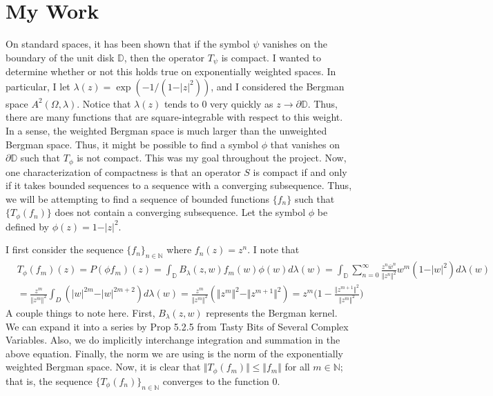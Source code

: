\documentclass[12pt]{article}
\newcommand{\N}{\mathbb{N}}
\begin{document}
\section*{My Work}
On standard spaces, it has been shown that if the symbol $\psi$ vanishes on the boundary of the unit disk $\mathbb{D}$, then the operator $T_\psi$ is compact. I wanted to determine whether or not this holds true on exponentially weighted spaces. In particular, I let $\lambda(z) = \exp(-1/(1-\vert z \vert^2))$, and I considered the Bergman space $A^2(\Omega,\lambda)$. Notice that $\lambda(z)$ tends to $0$ very quickly as $z \rightarrow \partial{\mathbb{D}}$. Thus, there are many functions that are square-integrable with respect to this weight. In a sense, the weighted Bergman space is much larger than the unweighted Bergman space. Thus, it might be possible to find a symbol $\phi$ that vanishes on $\partial{\mathbb{D}}$ such that $T_\phi$ is not compact. This was my goal throughout the project. Now, one characterization of compactness is that an operator $S$ is compact if and only if it takes bounded sequences to a sequence with a converging subsequence. Thus, we will be attempting to find a sequence of bounded functions $\{f_n\}$ such that $\{T_\phi(f_n)\}$ does not contain a converging subsequence. 
Let the symbol $\phi$ be defined by $\phi(z) = 1 - \vert z \vert^2$. 
\par I first consider the sequence $\{f_n\}_{n \in \N}$ where $f_n(z) = z^n$. I note that
\begin{align*}
&T_\phi(f_m)(z) =  P(\phi f_m)(z) = \int_\mathbb{D} B_\lambda(z,w) f_m(w) \phi(w) d\lambda(w) = \int_\mathbb{D} \sum_{n=0}^\infty \frac{z^n \overline{w}^n}{\Vert z^n \Vert^2} w^m (1 - \vert w \vert^2) d\lambda(w) \\
&= \frac{z^m}{\Vert z^m \Vert^2} \int_D (\vert w \vert^{2m} - \vert w \vert^{2m+2}) d\lambda(w) = \frac{z^m}{\Vert z^m \Vert^2} (\Vert z^m \Vert^2 - \Vert z^{m+1} \Vert^2) = z^m \bigg( 1 - \frac{\Vert z^{m+1}\Vert^2}{\Vert z^m \Vert^2}\bigg)
\end{align*} A couple things to note here. First, $B_\lambda(z,w)$ represents the Bergman kernel. We can expand it into a series by Prop 5.2.5 from Tasty Bits of Several Complex Variables. Also, we do implicitly interchange integration and summation in the above equation. Finally, the norm we are using is the norm of the exponentially weighted Bergman space. Now, it is clear that  $\Vert T_\phi(f_m) \Vert \leq \Vert f_m \Vert$ for all $m \in \N$; that is, the sequence $\{T_\phi(f_n)\}_{n \in \N}$ converges to the function $0$.
\end{document}
